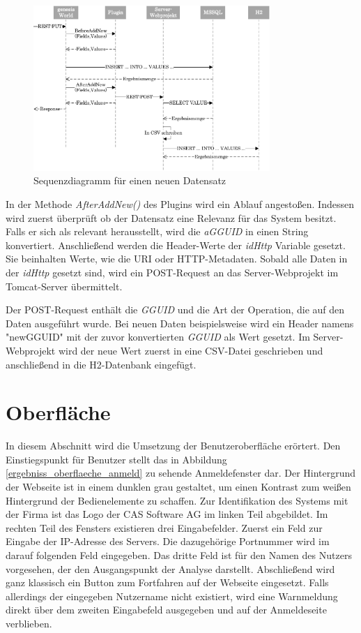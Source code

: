 \begin{figure}[htbp]
\centering
  \includegraphics[width=0.8\textwidth]{pics/sequenzdiagramm.pdf}
\caption{Sequenzdiagramm für einen neuen Datensatz}
\label{umsetzung_sequenz}
\end{figure}

In der Methode \textit{AfterAddNew()} des Plugins wird ein Ablauf angestoßen. Indessen wird zuerst überprüft ob der Datensatz eine Relevanz für das System besitzt. Falls er sich als relevant herausstellt, wird die \textit{aGGUID} in einen String konvertiert. Anschließend werden die Header-Werte der \textit{idHttp} Variable gesetzt. Sie beinhalten Werte, wie die URI oder HTTP-Metadaten. Sobald alle Daten in der \textit{idHttp} gesetzt sind, wird ein POST-Request an das Server-Webprojekt im Tomcat-Server übermittelt. 

Der POST-Request enthält die \textit{GGUID} und die Art der Operation, die auf den Daten ausgeführt wurde. Bei neuen Daten beispielsweise wird ein Header namens "newGGUID" mit der zuvor konvertierten \textit{GGUID} als Wert gesetzt. Im Server-Webprojekt wird der neue Wert zuerst in eine CSV-Datei geschrieben und anschließend in die H2-Datenbank eingefügt.


\section{Oberfläche}

In diesem Abschnitt wird die Umsetzung der Benutzeroberfläche erörtert. Den Einstiegspunkt für Benutzer stellt das in Abbildung \ref{ergebniss_oberflaeche_anmeld} zu sehende Anmeldefenster dar. Der Hintergrund der Webseite ist in einem dunklen grau gestaltet, um einen Kontrast zum weißen Hintergrund der Bedienelemente zu schaffen. Zur Identifikation des Systems mit der Firma ist das Logo der CAS Software AG im linken Teil abgebildet. Im rechten Teil des Fensters existieren drei Eingabefelder. Zuerst ein Feld zur Eingabe der IP-Adresse des Servers. Die dazugehörige Portnummer wird im darauf folgenden Feld eingegeben. Das dritte Feld ist für den Namen des Nutzers vorgesehen, der den Ausgangspunkt der Analyse darstellt. Abschließend wird ganz klassisch ein Button zum Fortfahren auf der Webseite eingesetzt. Falls allerdings der eingegeben Nutzername nicht existiert, wird eine Warnmeldung direkt über dem zweiten Eingabefeld ausgegeben und auf der Anmeldeseite verblieben. 

